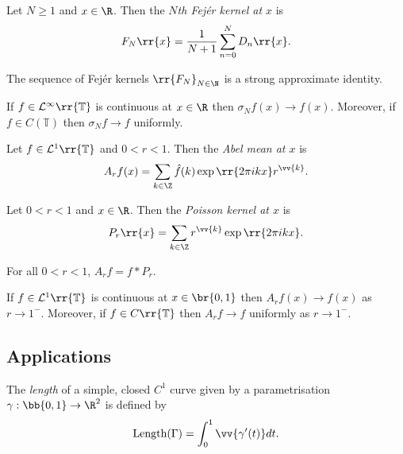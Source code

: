 \documentclass{article}
\begin{document}
\begin{definition}
  Let $N\geq 1$ and $x\in\R$. Then the \emph{$N$th Fej\'er kernel at $x$} is
  \begin{align*}
    F_N\rr{x}=\frac{1}{N+1}\sum_{n=0}^{N} D_n\rr{x}.
  \end{align*}
\end{definition}

\begin{proposition}
  The sequence of Fej\'er kernels $\rr{F_N}_{N\in\N}$ is a strong approximate identity.
\end{proposition}

\begin{corollary}
  If $f\in\mathcal L^\infty\rr{\mathbb T}$ is continuous at $x\in\R$ then
  $\sigma_N f(x)\to f(x)$. Moreover, if $f\in C(\mathbb T)$ then $\sigma_Nf\to f$
  uniformly.
\end{corollary}


\begin{definition}
  Let $f\in\mathcal L^1\rr{\mathbb T}$ and $0<r<1$. Then the \emph{Abel mean at $x$}
  is
  \begin{align*}
    A_r f(x) = \sum_{k\in\Z} \hat f(k)\exp\rr{2\pi ikx}r^{\vv{k}}.
  \end{align*}
\end{definition}

\begin{definition}
  Let $0<r<1$ and $x\in\R$. Then the \emph{Poisson kernel at $x$} is
  \begin{align*}
    P_r\rr{x}= \sum_{k\in\Z} r^{\vv{k}}\exp\rr{2\pi ikx}.
  \end{align*}
\end{definition}

\begin{proposition}
  For all $0<r<1$, $A_r f = f * P_r$.
\end{proposition}

\begin{theorem}
  If $f\in\mathcal L^1\rr{\mathbb T}$ is continuous at $x\in\br{0,1}$ then $A_r f(x)\to f(x)$
  as $r\to 1^-$. Moreover, if $f\in C\rr{\mathbb T}$ then $A_r f\to f$ uniformly as
  $r\to 1^-$.
\end{theorem}

\subsection{Applications}

\begin{definition}
  The \emph{length} of a simple, closed $C^1$ curve
  given by a parametrisation $\gamma : \bb{0,1}\to\R^2$ is
  defined by
  \begin{align*}
    \text{Length}(\Gamma) = \int_0^1 \vv{\gamma'(t)} dt.
  \end{align*}
\end{definition}
\end{document}
